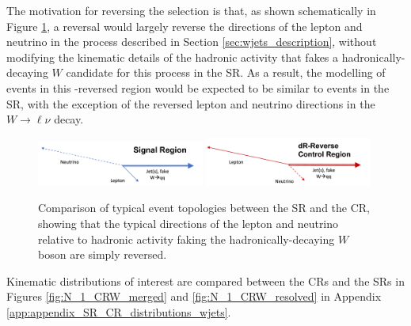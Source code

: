 The motivation for reversing the \DeltaR selection is that, as shown schematically in Figure \ref{fig:CRW_topology}, a \DeltaR reversal would largely reverse the directions of the lepton and neutrino in the \wjets process described in Section \ref{sec:wjets_description}, without modifying the kinematic details of the hadronic activity that fakes a hadronically-decaying \(W\) candidate for this process in the SR. As a result, the modelling of \wjets events in this \DeltaR-reversed region would be expected to be similar to \wjets events in the SR, with the exception of the reversed lepton and neutrino directions in the \(W\rightarrow\ell\nu\) decay.

\begin{figure}[htbp]
  \centering
  \includegraphics[width=0.49\textwidth]{Figures/5/SR_topology.pdf}
  \includegraphics[width=0.49\textwidth]{Figures/5/CRW_topology.pdf}
  \caption[Topologies in SR vs. CRW]{Comparison of typical event topologies between the SR and the \wjets CR, showing that the typical directions of the lepton and neutrino relative to hadronic activity faking the hadronically-decaying \(W\) boson are simply reversed.}
  \label{fig:CRW_topology}
\end{figure}

Kinematic distributions of interest are compared between the \wjets CRs and the SRs in Figures \ref{fig:N_1_CRW_merged} and \ref{fig:N_1_CRW_resolved} in Appendix \ref{app:appendix_SR_CR_distributions_wjets}. 

